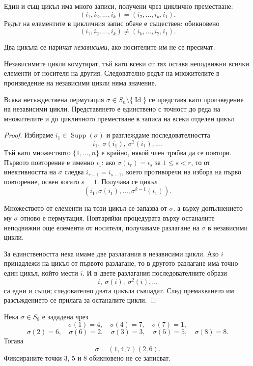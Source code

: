 Един и същ цикъл има много записи, получени чрез циклично преместване:
\[
(i_1,i_2,\ldots,i_k)
=
(i_2,\ldots,i_k,i_1).
\]
Редът на елементите в цикличния запис обаче е съществен: обикновено
\[
(i_1,i_2,\ldots,i_k)\ne(i_k,\ldots,i_2,i_1).
\]

\begin{defn}
Два цикъла се наричат \emph{независими}, ако носителите им не се пресичат.
\end{defn}

Независимите цикли комутират, тъй като всеки от тях оставя неподвижни всички елементи от носителя на другия. Следователно редът на множителите в произведение на независими цикли няма значение.

\begin{thm}
Всяка нетъждествена пермутация $\sigma\in S_n\setminus\{\operatorname{Id}\}$ се представя като произведение на независими цикли. Представянето е единствено с точност до реда на множителите и до цикличното преместване в записа на всеки отделен цикъл.
\end{thm}

\begin{proof}
Избираме $i_1\in\operatorname{Supp}(\sigma)$ и разглеждаме последователността
\[
i_1,\ \sigma(i_1),\ \sigma^2(i_1),\ldots.
\]
Тъй като множеството $\{1,\ldots,n\}$ е крайно, някой член трябва да се повтори. Първото повторение е именно $i_1$: ако $\sigma(i_r)=i_s$ за $1\le s<r$, то от инективността на $\sigma$ следва $i_{r-1}=i_{s-1}$, което противоречи на избора на първо повторение, освен когато $s=1$. Получава се цикъл
\[
(i_1,\sigma(i_1),\ldots,\sigma^{k-1}(i_1)).
\]

Множеството от елементи на този цикъл се запазва от $\sigma$, а върху допълнението му $\sigma$ отново е пермутация. Повтаряйки процедурата върху останалите неподвижни още елементи от носителя, получаваме разлагане на $\sigma$ в независими цикли.

За единствеността нека имаме две разлагания в независими цикли. Ако $i$ принадлежи на цикъл от първото разлагане, то в другото разлагане има точно един цикъл, който мести $i$. И в двете разлагания последователните образи
\[
i,\ \sigma(i),\ \sigma^2(i),\ldots
\]
са едни и същи; следователно двата цикъла съвпадат. След премахването им разсъждението се прилага за останалите цикли.
\end{proof}

\begin{example}
Нека $\sigma\in S_8$ е зададена чрез
\[
\sigma(1)=4,\quad \sigma(4)=7,\quad \sigma(7)=1,
\]
\[
\sigma(2)=6,\quad \sigma(6)=2,\quad \sigma(3)=3,\quad \sigma(5)=5,\quad \sigma(8)=8.
\]
Тогава
\[
\sigma=(1,4,7)(2,6).
\]
Фиксираните точки $3$, $5$ и $8$ обикновено не се записват.
\end{example}

